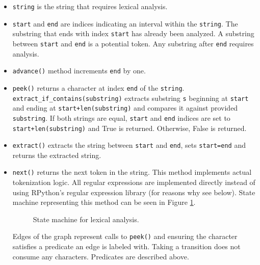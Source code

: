 \begin{itemize}
\item
\texttt{string} is the string that requires lexical analysis.

\item
\texttt{start} and \texttt{end} are indices indicating an interval within the \texttt{string}. The substring that ends with index \texttt{start} has already been analyzed. A substring between \texttt{start} and \texttt{end} is a potential token. Any substring after \texttt{end} requires analysis.

\item
\texttt{advance()} method increments \texttt{end} by one.

\item
\texttt{peek()} returns a character at index \texttt{end} of the \texttt{string}.
\texttt{extract\_if\_contains(substring)} extracts substring \texttt{s} beginning at \texttt{start} and ending at \texttt{start+len(substring)} and compares it against provided \texttt{substring}. If both strings are equal, \texttt{start} and \texttt{end} indices are set to \texttt{start+len(substring)} and True is returned. Otherwise, False is returned.

\item
\texttt{extract()} extracts the string between \texttt{start} and \texttt{end}, sets \texttt{start=end} and returns the extracted string.

\item
	\texttt{next()} returns the next token in the string. This method implements actual tokenization logic. All regular expressions are implemented directly instead of using RPython's regular expression library (for reasons why see below). State machine representing this method can be seen in Figure \ref{lexical-analysis-tokenize}.

\begin{figure}[th!]
	\centering
\caption{State machine for lexical analysis.}
\label{lexical-analysis-tokenize}
\end{figure}

Edges of the graph represent calls to \texttt{peek()} and ensuring the character satisfies a predicate an edge is labeled with. Taking a transition does not consume any characters. Predicates are described above.


\end{itemize}
